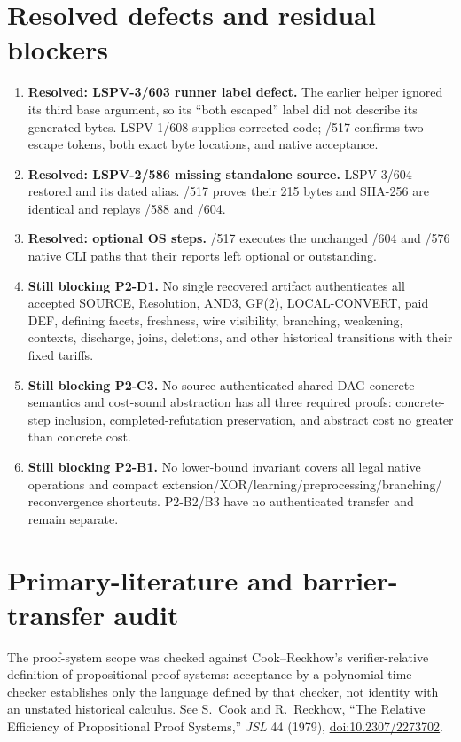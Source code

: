 \documentclass[11pt]{article}
\begin{document}
\section{Resolved defects and residual blockers}
\begin{enumerate}
\item \textbf{Resolved: LSPV-3/603 runner label defect.}  The earlier helper
ignored its third base argument, so its ``both escaped'' label did not describe
its generated bytes.  LSPV-1/608 supplies corrected code; /517 confirms two
escape tokens, both exact byte locations, and native acceptance.
\item \textbf{Resolved: LSPV-2/586 missing standalone source.}  LSPV-3/604
restored  and its dated alias.
/517 proves their 215 bytes and SHA-256 are identical and replays /588 and /604.
\item \textbf{Resolved: optional OS steps.}  /517 executes the unchanged /604
and /576 native CLI paths that their reports left optional or outstanding.
\item \textbf{Still blocking P2-D1.}  No single recovered artifact authenticates
all accepted SOURCE, Resolution, AND3, GF(2), LOCAL-CONVERT, paid DEF, defining
facets, freshness, wire visibility, branching, weakening, contexts, discharge,
joins, deletions, and other historical transitions with their fixed tariffs.
\item \textbf{Still blocking P2-C3.}  No source-authenticated shared-DAG
concrete semantics and cost-sound abstraction has all three required proofs:
concrete-step inclusion, completed-refutation preservation, and abstract cost
no greater than concrete cost.
\item \textbf{Still blocking P2-B1.}  No lower-bound invariant covers all legal
native operations and compact extension/XOR/learning/preprocessing/branching/
reconvergence shortcuts.  P2-B2/B3 have no authenticated transfer and remain
separate.
\end{enumerate}

\section{Primary-literature and barrier-transfer audit}
The proof-system scope was checked against Cook--Reckhow's verifier-relative
definition of propositional proof systems: acceptance by a polynomial-time
checker establishes only the language defined by that checker, not identity
with an unstated historical calculus.  See S.~Cook and R.~Reckhow,
``The Relative Efficiency of Propositional Proof Systems,'' \emph{JSL} 44
(1979), \href{https://doi.org/10.2307/2273702}{doi:10.2307/2273702}.
\end{document}
